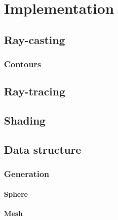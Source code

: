 \chapter{Implementation}
\label{implementation}

\section{Ray-casting}

\subsection{Contours}

\section{Ray-tracing}

\section{Shading}

\section{Data structure}

\subsection{Generation}

\subsubsection{Sphere}

\subsubsection{Mesh}
